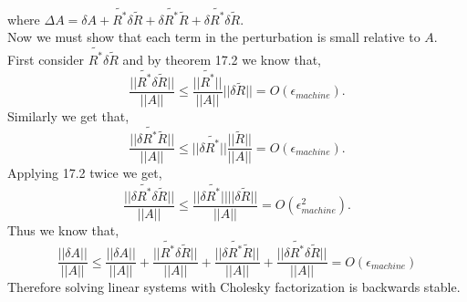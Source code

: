 \documentclass[12pt]{article}
\makeatletter
\theoremstyle{homework}
\newenvironment{exercise}[1]
{\def\@currentlabel{#1}\exercisecore}
{\endexercisecore}
\makeatother
\begin{document}
\begin{exercise}{23.2}
\begin{equation*}
  \end{equation*}
  where $\Delta A = \delta A + \tilde{R^*}\delta\tilde{R} + \delta\tilde{R^*}\tilde{R} +  \delta \tilde{R^*} \delta \tilde{R}$.\\
  Now we must show that each term in the perturbation is small relative to $A$. First consider $\tilde{R^*}\delta\tilde{R}$ and by theorem 17.2 we know that, 
  \begin{equation*}
    \dfrac{||\tilde{R^*}\delta\tilde{R}||}{||A||} \leq \dfrac{||\tilde{R^*}||}{||A||}||\delta\tilde{R}|| = O(\epsilon_{machine}).
  \end{equation*}
  Similarly we get that, 
  \begin{equation*}
    \dfrac{||\delta\tilde{R^*}\tilde{R}||}{||A||} \leq ||\delta\tilde{R^*}||\dfrac{||\tilde{R}||}{||A||}= O(\epsilon_{machine}).
  \end{equation*}
  Applying 17.2 twice we get, 
  \begin{equation*}
    \dfrac{||\delta\tilde{R^*}\delta\tilde{R}||}{||A||} \leq  \dfrac{||\delta\tilde{R^*}||||\delta\tilde{R}||}{||A||} = O(\epsilon^2_{machine}).
  \end{equation*}
  Thus we know that, 
  \begin{equation*}
    \dfrac{||\delta A||}{||A||} \leq   \dfrac{||\delta A||}{||A||} + \dfrac{||\tilde{R^*}\delta\tilde{R}||}{||A||} +  \dfrac{||\delta\tilde{R^*}\tilde{R}||}{||A||} +   \dfrac{||\delta\tilde{R^*}\delta\tilde{R}||}{||A||}  =  O(\epsilon_{machine})
  \end{equation*}
  Therefore solving linear systems with Cholesky factorization is backwards stable. 
\end{exercise}

\vspace{1in}
\end{document}
